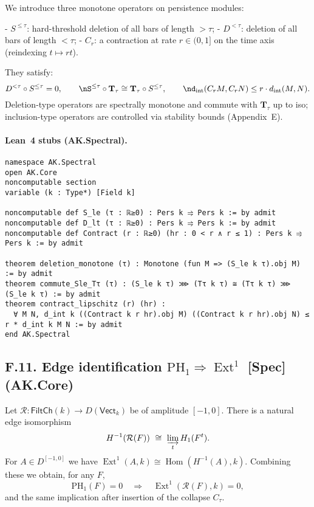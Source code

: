 \documentclass[11pt]{article}
\numberwithin{equation}{section}
\theoremstyle{plain}
\theoremstyle{definition}
\theoremstyle{remark}
\DeclareMathOperator{\Ext}{Ext}
\DeclareMathOperator{\Hom}{Hom}
\theoremstyle{plain}
\theoremstyle{definition}
\numberwithin{equation}{section}
\theoremstyle{definition}
\numberwithin{equation}{section}
\theoremstyle{plain}
\theoremstyle{definition}
\theoremstyle{remark}
\begin{document}
We introduce three monotone operators on persistence modules:

- \(S^{\le\tau}\): hard-threshold deletion of all bars of length \(>\tau\);
- \(D^{<\tau}\): deletion of all bars of length \(<\tau\);
- \(C_r\): a contraction at rate \(r\in(0,1]\) on the time axis (reindexing \(t\mapsto rt\)).

They satisfy:
\[
D^{<\tau}\circ S^{\le \tau} = 0,\qquad\nS^{\le\tau}\circ \mathbf{T}_\tau \cong \mathbf{T}_\tau\circ S^{\le\tau},\qquad\nd_{\mathrm{int}}(C_r M, C_r N)\le r\cdot d_{\mathrm{int}}(M,N).
\]
Deletion-type operators are spectrally monotone and commute with \(\mathbf{T}_\tau\) up to iso; inclusion-type operators are controlled via stability bounds (Appendix~E).

\paragraph{Lean~4 stubs (AK.Spectral).}
\begin{verbatim}
namespace AK.Spectral
open AK.Core
noncomputable section
variable (k : Type*) [Field k]

noncomputable def S_le (τ : ℝ≥0) : Pers k ⥤ Pers k := by admit
noncomputable def D_lt (τ : ℝ≥0) : Pers k ⥤ Pers k := by admit
noncomputable def Contract (r : ℝ≥0) (hr : 0 < r ∧ r ≤ 1) : Pers k ⥤ Pers k := by admit

theorem deletion_monotone (τ) : Monotone (fun M => (S_le k τ).obj M) := by admit
theorem commute_Sle_Tτ (τ) : (S_le k τ) ⋙ (Tτ k τ) ≅ (Tτ k τ) ⋙ (S_le k τ) := by admit
theorem contract_lipschitz (r) (hr) :
  ∀ M N, d_int k ((Contract k r hr).obj M) ((Contract k r hr).obj N) ≤ r * d_int k M N := by admit
end AK.Spectral
\end{verbatim}

\subsection*{F.11. Edge identification \(\mathrm{PH}_1 \Rightarrow \Ext^1\) [Spec] (AK.Core)}

Let \(\mathcal{R}:\mathsf{FiltCh}(k)\to D(\mathsf{Vect}_k)\) be of amplitude \([-1,0]\).
There is a natural edge isomorphism
\[
H^{-1}(\mathcal{R}(F))\ \cong\ \varinjlim_{t} H_1(F^t).
\]
For \(A\in D^{[-1,0]}\) we have \(\Ext^1(A,k)\cong \Hom(H^{-1}(A),k)\).
Combining these we obtain, for any \(F\),
\[
\mathrm{PH}_1(F)=0\quad\Longrightarrow\quad \Ext^1(\mathcal{R}(F),k)=0,
\]
and the same implication after insertion of the collapse \(C_\tau\).
\end{document}

